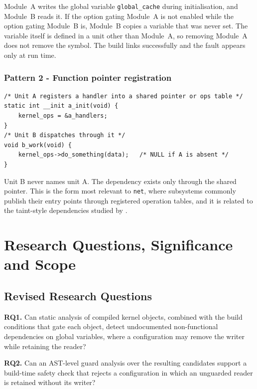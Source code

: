 \documentclass[12pt, a4paper, oneside]{book}
\begin{document}
Module~A writes the global variable \texttt{global\_cache} during initialisation,
and Module~B reads it. If the option gating Module~A is not enabled while the
option gating Module~B is, Module~B copies a variable that was never set. The
variable itself is defined in a unit other than Module~A, so removing Module~A
does not remove the symbol. The build links successfully and the fault appears
only at run time.

\subsection*{Pattern 2 - Function pointer registration}

\begin{verbatim}
/* Unit A registers a handler into a shared pointer or ops table */
static int __init a_init(void) {
    kernel_ops = &a_handlers;
}
/* Unit B dispatches through it */
void b_work(void) {
    kernel_ops->do_something(data);   /* NULL if A is absent */
}
\end{verbatim}

Unit B never names unit A. The dependency exists only through the shared pointer.
This is the form most relevant to \texttt{net}, where subsystems commonly publish
their entry points through registered operation tables, and it is related to the
taint-style dependencies studied by \citet{zhang2021taint}.


\chapter{Research Questions, Significance and Scope}

\section{Revised Research Questions}

\textbf{RQ1.} Can static analysis of compiled kernel objects, combined with the
build conditions that gate each object, detect undocumented non-functional
dependencies on global variables, where a configuration may remove the writer
while retaining the reader?

\vspace{6pt}
\textbf{RQ2.} Can an AST-level guard analysis over the resulting candidates
support a build-time safety check that rejects a configuration in which an
unguarded reader is retained without its writer?
\end{document}
